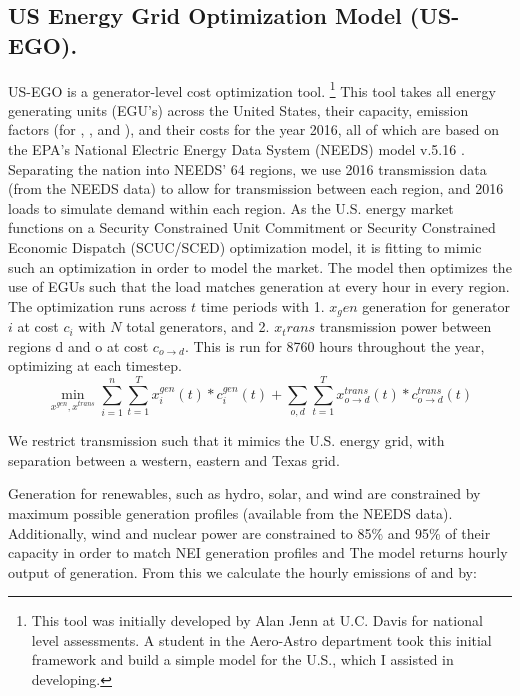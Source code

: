 \documentclass[12]{article}
\begin{document}
\subsection{US Energy Grid Optimization Model (US-EGO).}
US-EGO is a generator-level cost optimization tool. \footnote{This tool was initially developed by Alan Jenn at U.C. Davis for national level assessments. A student in the Aero-Astro department took this initial framework and build a simple model for the U.S., which I assisted in developing.} This tool takes all energy generating units (EGU's) across the United States, their capacity, emission factors (for , , and ), and their costs for the year 2016, all of which are based on the EPA's National Electric Energy Data System (NEEDS) model v.5.16 \citep{epa_power_2016}. Separating the nation into NEEDS' 64 regions, we use 2016 transmission data (from the NEEDS data) to allow for transmission between each region, and 2016 loads to simulate demand within each region. As the U.S. energy market functions on a Security Constrained Unit Commitment or Security Constrained Economic Dispatch (SCUC/SCED) optimization model, it is fitting to mimic such an optimization in order to model the market\citep{ela_evolution_2014}. The model then optimizes the use of EGUs such that the load matches generation at every hour in every region. The optimization runs across $t$ time periods with 1. $x_gen$ generation for generator $i$ at cost $c_i$ with $N$ total generators, and 2. $x_trans$ transmission power between regions d and o at cost $c_{o\rightarrow{}d}$. This is run for 8760 hours throughout the year, optimizing at each timestep. \citep{jenn_future_2018}
\begin{equation}
    \min\limits_{x^{gen}, x^{trans}}\sum_{i=1}^{n}\sum_{t=1}^{T} x^{gen}_{i}(t)*c^{gen}_{i}(t) + \sum_{o,d}\sum_{t=1}^{T} x^{trans}_{o\rightarrow{}d}(t)*c^{trans}_{o\rightarrow{}d}(t)
\end{equation}

We restrict transmission such that it mimics the U.S. energy grid, with separation between a western, eastern and Texas grid.

Generation for renewables, such as hydro, solar, and wind are constrained by maximum possible generation profiles (available from the NEEDS data). Additionally, wind and nuclear power are constrained to 85\% and 95\% of their capacity in order to match NEI generation profiles and 
The model returns hourly output of generation. From this we calculate the hourly emissions of  and  by:
\end{document}
